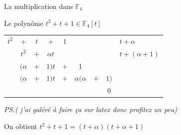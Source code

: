 \begin{parag}{La multiplication dans $\mathbb{F}_4$}
\begin{subparag}{Le polynôme $t^2 + t + 1 \in \mathbb{F}_4[t]$}
                \begin{center}
        \begin{tabular}{c@{\,}c@{\,}c@{\,}c@{\,}c@{\,}c@{\,}c@{\,}c@{\,}|l}
            $t^2$ & $+$  &  $t$  &  $+$ & $1$   &   &    & $\quad$ & $t + \alpha$ \\
            \hhline{~~~~~~~~|-}
             & $t^2$ & $+$ & $\alpha t$  &    &   &    &   & $t + (\alpha + 1)$ \\
            \hhline{~-----~~|~}
              &  $(\alpha$ &  $+$ & $1)t$  & $+$   & 1  &   &   & \\
              &  $(\alpha$ & + & $1)t$ & $+$ &$\alpha(\alpha$   &  $+$  & $1)$  & \\
            \hhline{~-------|~}
              &   &    &   &  &   &    & $0$  & 
              
        \end{tabular}
        \end{center}
        \textit{PS.( j'ai galéré à faire ça sur latex donc profitez un peu)}
            
            On obtient $t^2 + t + 1 = (t+\alpha)(t + \alpha + 1)$
        \end{subparag}
        \end{parag}

